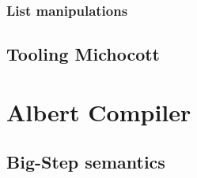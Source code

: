 \documentclass{report}
\begin{document}
\subsection{List manipulations}

\section{Tooling Michocott}

\chapter{Albert Compiler}

\section{Big-Step semantics}

{}


\tableofcontents
{}
\end{document}

